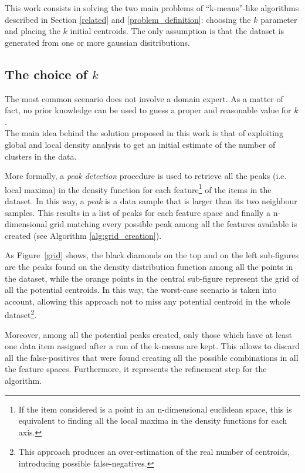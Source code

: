 This work consists in solving the two main problems of ``k-means''-like
algorithms described in Section \ref{related} and \ref{problem_definition}:
choosing the $k$ parameter and placing the $k$ initial centroids.
The only assumption is that the dataset is generated from one or more gaussian
disitributions.


\subsection{The choice of $k$}
The most common scenario does not involve a domain expert. As a matter of fact,
no prior knowledge can be used to guess a proper and reasonable value for $k$.\\
The main idea behind the solution proposed in this work is that of exploiting global
and local density analysis to get an initial estimate of the number of clusters
in the data.

More formally, a \emph{peak detection} procedure is used to retrieve
all the peaks (i.e. local maxima) in the density function for each feature\footnote{If
the item considered is a point in an n-dimensional euclidean space, this is equivalent to
finding all the local maxima in the density functions for each axis.} of the items in
the dataset. In this way, a \emph{peak} is a data sample that is larger than
its two neighbour samples.
This results in a list of peaks for each feature space and finally a n-dimensional grid
matching every possible peak among all the features available is created
(see Algorithm \ref{alg:grid_creation}).


As Figure~\ref{grid} shows, the black diamonds on the top and on
the left sub-figures are the peaks found on the density distribution function among all
the points in the dataset, while the orange points in the central sub-figure represent the
grid of all the potential centroids.
In this way, the worst-case scenario is taken into account, allowing this approach not
to miss any potential centroid in the whole dataset\footnote{This approach produces an
over-estimation of the real number of centroids, introducing possible false-negatives.}.

\begin{figure*}
  \caption{The grid with all the potential centroids computed from the peaks.}
  \label{grid}
\end{figure*}

Moreover, among all the potential peaks created, only those which have at least one data
item assigned after a run of the k-means are kept. This allows to discard all the
false-positives that were found creating all the possible combinations in all the feature spaces.
Furthermore, it represents the refinement step for the algorithm.

